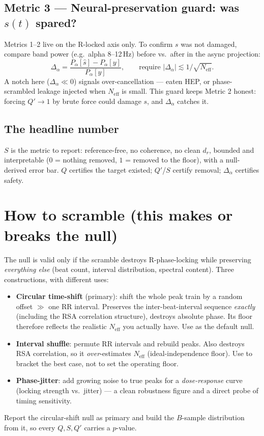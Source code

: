 \documentclass[11pt]{article}
\newcommand{\Neff}{N_{\mathrm{eff}}}
\newcommand{\shat}{\widehat{s}}
\begin{document}
\subsection*{Metric 3 --- Neural-preservation guard: was $s(t)$ spared?}
Metrics 1--2 live on the R-locked axis only. To confirm $s$ was not damaged, compare band power
(e.g.\ alpha 8--12\,Hz) before vs.\ after in the async projection:
\begin{equation}
\Delta_\alpha = \frac{P_\alpha[\shat] - P_\alpha[y]}{P_\alpha[y]},
\qquad \text{require } |\Delta_\alpha| \lesssim 1/\sqrt{\Neff}.
\end{equation}
A notch here ($\Delta_\alpha \ll 0$) signals over-cancellation --- eaten HEP, or phase-scrambled
leakage injected when $\Neff$ is small. This guard keeps Metric 2 honest: forcing $Q'\to1$ by brute
force could damage $s$, and $\Delta_\alpha$ catches it.

\subsection*{The headline number}
$S$ is the metric to report: reference-free, no coherence, no clean $d_r$, bounded and
interpretable ($0$ = nothing removed, $1$ = removed to the floor), with a null-derived error bar.
$Q$ certifies the target existed; $Q'$/$S$ certify removal; $\Delta_\alpha$ certifies safety.

\section{How to scramble (this makes or breaks the null)}

The null is valid only if the scramble destroys R-phase-locking while preserving \emph{everything
else} (beat count, interval distribution, spectral content). Three constructions, with different
uses:
\begin{itemize}[leftmargin=1.4em,itemsep=3pt]
\item \textbf{Circular time-shift} (primary): shift the whole peak train by a random offset
$\gg$ one RR interval. Preserves the inter-beat-interval sequence \emph{exactly} (including the
RSA correlation structure), destroys absolute phase. Its floor therefore reflects the realistic
$\Neff$ you actually have. Use as the default null.
\item \textbf{Interval shuffle}: permute RR intervals and rebuild peaks. Also destroys RSA
correlation, so it \emph{over}-estimates $\Neff$ (ideal-independence floor). Use to bracket the
best case, not to set the operating floor.
\item \textbf{Phase-jitter}: add growing noise to true peaks for a \emph{dose-response} curve
(locking strength vs.\ jitter) --- a clean robustness figure and a direct probe of timing
sensitivity.
\end{itemize}
Report the circular-shift null as primary and build the $B$-sample distribution from it, so every
$Q, S, Q'$ carries a $p$-value.
\end{document}
